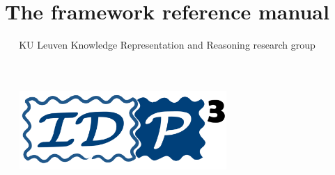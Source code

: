 \documentclass[a4]{article}
\title{The \idp framework reference manual}
\author{KU Leuven Knowledge Representation and Reasoning research group}
\begin{document}
\maketitle

\begin{figure}[!h]
\centering
\includegraphics[width=0.7\textwidth]{idp3logo}
\end{figure}

\renewcommand{\todo}[1]{}                        %



\newpage
\tableofcontents

\newpage

\todo{everywhere in the text, replace dollar signs and \code{\{ tt ... \}} by \code{code \{ ... \}}}


























\end{document}
